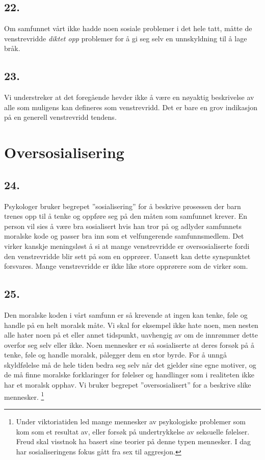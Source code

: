 \documentclass[oneside]{book}
\begin{document}
\section*{22.}
Om samfunnet vårt ikke hadde noen sosiale problemer i det hele tatt, måtte de venstrevridde {\em diktet opp} problemer for å gi seg selv en unnskyldning til å lage bråk.

\section*{23.}
Vi understreker at det foregående hevder ikke å være en nøyaktig beskrivelse av alle som muligens kan defineres som venstrevridd. Det er bare en grov indikasjon på en generell venstrevridd tendens.

\chapter{Oversosialisering}
\section*{24.}
Psykologer bruker begrepet ''sosialisering'' for å beskrive prosessen der barn trenes opp til å tenke og oppføre seg på den måten som samfunnet krever. En person vil sies å være bra sosialisert hvis han tror på og adlyder samfunnets moralske kode og passer bra inn som et velfungerende samfunnsmedlem. Det virker kanskje meningsløst å si at mange venstrevridde er oversosialiserte fordi den venstrevridde blir sett på som en opprører. Uansett kan dette synspunktet forsvares. Mange venstrevridde er ikke like store opprørere som de virker som.

\section*{25.}
Den moralske koden i vårt samfunn er så krevende at ingen kan tenke, føle og handle på en helt moralsk måte. Vi skal for eksempel ikke hate noen, men nesten alle hater noen på et eller annet tidspunkt, uavhengig av om de innrømmer dette overfor seg selv eller ikke. Noen mennesker er så sosialiserte at deres forsøk på å tenke, føle og handle moralsk, pålegger dem en stor byrde. For å unngå skyldfølelse må de hele tiden bedra seg selv når det gjelder sine egne motiver, og de må finne moralske forklaringer for følelser og handlinger som i realiteten ikke har et moralsk opphav. Vi bruker begrepet ''oversosialisert'' for a beskrive slike mennesker. \footnote{Under viktoriatiden led mange mennesker av psykologiske problemer som kom som et resultat av, eller forsøk på undertrykkelse av seksuelle følelser. Freud skal visstnok ha basert sine teorier på denne typen mennesker. I dag har sosialiseringens fokus gått fra sex til aggresjon.}
\end{document}

